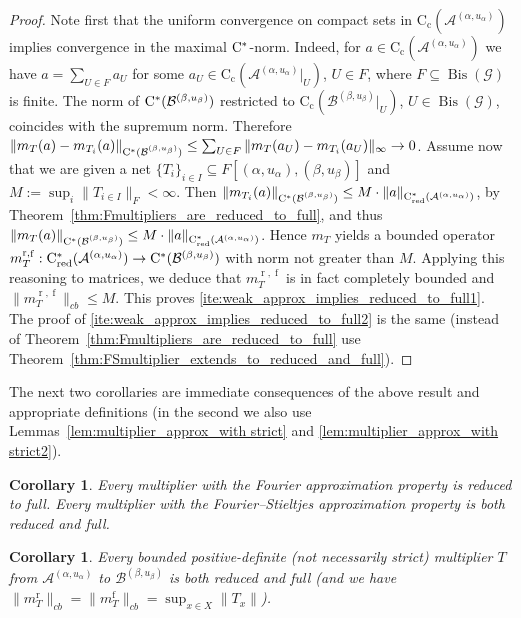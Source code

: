 \documentclass[11 pt, leqno]{amsart}
\numberwithin{equation}{section}
\theoremstyle{plain}
\newtheorem{cor}[thm]{Corollary}
\theoremstyle{definition}
\newcommand*{\contc}{\mathrm{C_c}}%
\DeclareMathOperator{\red}{red}%
\DeclareMathOperator{\rd}{r}%
\DeclareMathOperator{\f}{f}%
\DeclareMathOperator{\Bis}{Bis}
\newcommand{\B}{\mathcal B}
\newcommand{\m}{m}
\newcommand{\G}{\mathcal G} %
\newcommand{\A}{\mathcal A}
\newcommand{\cst}{\ifmmode\mathrm{C}^*\else{$\mathrm{C}^*$}\fi}
\begin{document}
\begin{proof} 
Note first that the uniform convergence on compact sets in $\contc(\A^{(\alpha,u_{\alpha})})$ implies convergence in the maximal $\cst$-norm. 
Indeed, for  $a\in\contc(\A^{(\alpha,u_{\alpha})})$ we have $a = \sum_{U\in F} a_{U}$ for some $a_U \in \contc(\A^{(\alpha,u_{\alpha})}|_{U})$, $U\in F$, where $F\subseteq \Bis(\G)$ is finite. 
The norm of $\cst(\B^{(\beta,u_{\beta})})$ restricted to $\contc(\B^{(\beta,u_{\beta})}|_{U})$, $U\in \Bis(\G)$, coincides with the supremum norm. 
Therefore $\| \m_{T}(a) - \m_{T_i}(a) \|_{\cst(\B^{(\beta,u_{\beta})})} \leq \sum_{U\in F} \| \m_{T}(a_U) - \m_{T_i}(a_U) \|_{\infty} \to 0$. 
Assume now that we are given a net $\{T_{i}\}_{i\in I}\subseteq  F[(\alpha,u_{\alpha}), (\beta,u_{\beta})]$ and $M:=\sup_{i}\|T_{i\in I}\|_{F}<\infty$. 
Then $\|\m_{T_i}(a)\|_{\cst(\B^{(\beta,u_{\beta})})} \leq M \cdot \|a\|_{\cst_{\red}(\A^{(\alpha,u_{\alpha})})}$, by Theorem~\ref{thm:Fmultipliers_are_reduced_to_full}, and thus $\| \m_{T}(a) \|_{\cst(\B^{(\beta,u_{\beta})})} \leq M \cdot \|a\|_{\cst_{\red}(\A^{(\alpha,u_{\alpha})})}$. 
Hence $\m_T$ yields a bounded operator $\m_T^{\rd,\f}:\cst_{\red}(\A^{(\alpha,u_{\alpha})})\to \cst(\B^{(\beta,u_{\beta})})$ with norm not greater than $M$. 
Applying this reasoning to matrices, we deduce that  $\m_T^{\rd,\f}$ is in fact completely bounded and $\| \m_T^{\rd,\f} \|_{cb}\leq M$. 
This proves \ref{ite:weak_approx_implies_reduced_to_full1}. 
The proof of \ref{ite:weak_approx_implies_reduced_to_full2} is the same (instead of Theorem~\ref{thm:Fmultipliers_are_reduced_to_full} use Theorem~\ref{thm:FSmultiplier_extends_to_reduced_and_full}).
\end{proof}

The next two corollaries are immediate consequences of the above result and appropriate definitions (in the second we also use Lemmas~\ref{lem:multiplier_approx_with strict} and \ref{lem:multiplier_approx_with strict2}).

\begin{cor}\label{cor:weak_approx_implies_reduced_to_full}
Every multiplier with the Fourier approximation property is reduced to full. 
Every multiplier with the Fourier--Stieltjes approximation property is both reduced and full.
\end{cor}

\begin{cor}\label{cor:positive_definite_is_full_and_reduced}
Every bounded positive-definite (not necessarily strict) multiplier $T$ from $\A^{(\alpha,u_{\alpha})}$ to $\B^{(\beta,u_{\beta})}$ is both reduced and full (and we have $\|\m_T^{\rd}\|_{cb}=\|\m_T^{\f}\|_{cb}=\sup_{x\in X}\|T_x\|$).
\end{cor}
\end{document}

